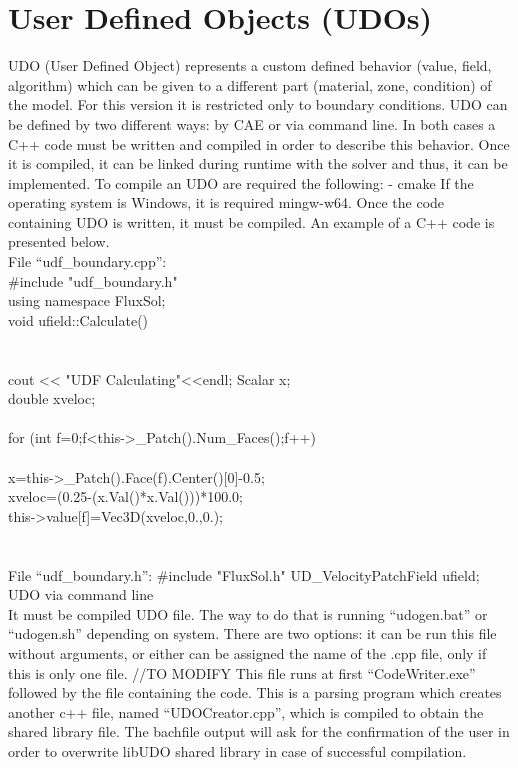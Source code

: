 \documentclass{article}     %
\begin{document}
\section{User Defined Objects (UDOs)}
UDO (User Defined Object) represents a custom defined  behavior (value, field, algorithm) which can be given to a different part (material, zone, condition) of the model. For this version it is restricted only to boundary conditions. UDO can be defined by two different ways: by CAE or via command line. In both cases a C++ code must be written and compiled in order to describe this behavior. Once it is compiled, it can be linked during runtime with the solver and thus, it can be implemented. 
To compile an UDO are required the following:
- cmake
If the operating system is Windows, it is required mingw-w64.
Once the code containing UDO is written, it must be compiled. 
An example of a C++ code is presented below. \\
File “udf\_boundary.cpp”:\\
\#include "udf\_boundary.h"\\
using namespace FluxSol;\\
void ufield::Calculate()\\
{\\
\\
    cout << "UDF Calculating"<<endl;
	Scalar x;\\
	double xveloc;\\
\\
	for (int f=0;f<this->\_Patch().Num\_Faces();f++)\\
	\\
		x=this->\_Patch().Face(f).Center()[0]-0.5;\\
		xveloc=(0.25-(x.Val()*x.Val()))*100.0;\\
		this->value[f]=Vec3D(xveloc,0.,0.);\\
	\\
}\\
File “udf\_boundary.h”:
\#include "FluxSol.h"
UD\_VelocityPatchField ufield;
UDO via command line
\\
It must be compiled UDO file. The way to do that is running “udogen.bat” or “udogen.sh” depending on system. There are two options: it can be run this file without arguments, or either can be assigned the name of the .cpp file, only if this is only one file. //TO MODIFY
This file runs at first “CodeWriter.exe” followed by the file containing the code. This is a parsing program which creates another c++ file, named “UDOCreator.cpp”, which is compiled to obtain the shared library file. The bachfile output will ask for the confirmation of the user in order to overwrite libUDO shared library in case of successful compilation.
\end{document}

